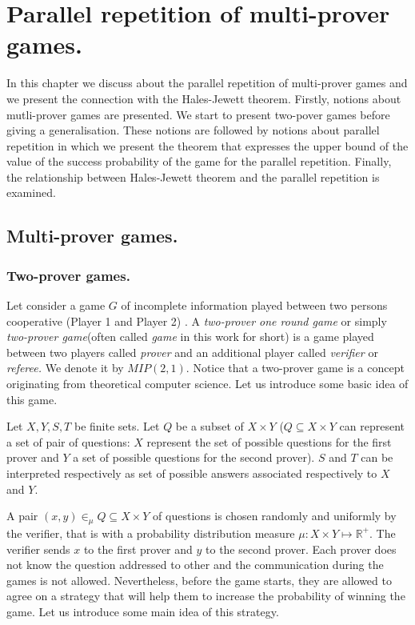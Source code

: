 \chapter{Parallel repetition of multi-prover games.}

In this chapter we discuss about the parallel repetition of multi-prover games and we present the connection with the Hales-Jewett theorem. Firstly, notions about mutli-prover games are presented. We start to present two-pover games before giving a generalisation. These notions are followed by notions about parallel repetition in which we present the theorem that expresses the upper bound of the value of the success probability of the game for the parallel repetition. Finally, the relationship between Hales-Jewett theorem and the parallel repetition  is examined.


\section{Multi-prover games.}


\subsection{Two-prover games.} \label{tpg}

Let consider a game $G$  of incomplete information played between two persons cooperative (Player 1 and Player 2) \citep{verbitsky1996towards, raz2010parallel}. A \textit{two-prover one round  game} or simply \textit{two-prover game}(often called \textit{game} in this work for short) is a game played between two players called \textit{prover} and an additional player called \textit{verifier} or \textit{referee.} We denote it by $MIP(2,1)$. Notice that a two-prover game is a concept originating from theoretical computer science. Let us introduce some basic idea of this game.

Let $X, Y, S, T$ be  finite sets. Let $Q$ be a subset of $X\times Y$ ($Q \subseteq X \times Y$ can represent a set of pair of questions: $X$ represent the set of possible questions for the first prover and $Y$ a set of possible questions for the second prover).    $S$ and $T$ can be interpreted respectively as set of possible answers associated respectively to $X$ and $Y.$

A pair $(x,y) \in_{\mu} Q \subseteq X\times Y$ of questions is chosen randomly and uniformly by the verifier, that is with a probability distribution measure $\mu: X \times Y \longmapsto \mathbb{R}^+.$ The verifier sends $x$ to the first prover and $y$ to the second prover. Each prover does not know the question addressed to other and the communication during the games is not allowed. Nevertheless, before the game starts, they are allowed to agree on a strategy that will help them to increase the probability of winning the game. Let us introduce some main idea of this strategy. 

